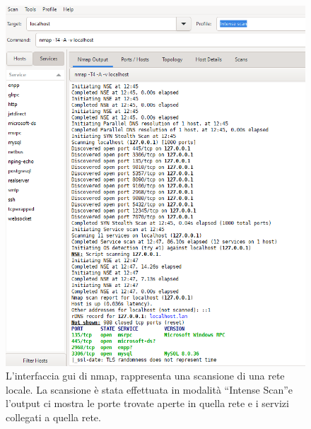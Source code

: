         
        \begin{figure}[H]
            \centering
            \includegraphics[width=1.0\textwidth]{Immagini/nmap.PNG}
            \caption{L'interfaccia gui di nmap, rappresenta una scansione di una rete locale. La scansione è stata effettuata in modalità “Intense Scan”\protect\footnotemark e l'output ci mostra le porte trovate aperte in quella rete e i servizi collegati a quella rete.}
            \label{fig:nmap_scan}
        \end{figure}

